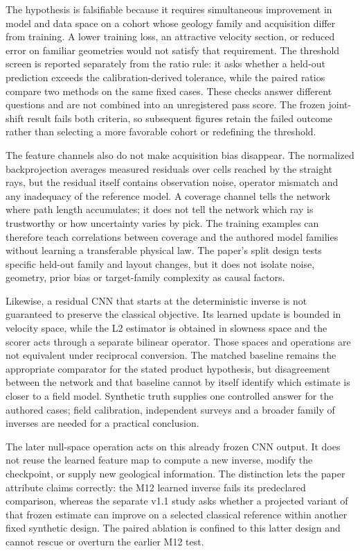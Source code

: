 \documentclass[11pt]{article}
\begin{document}
The hypothesis is falsifiable because it requires simultaneous improvement in model and data space on a cohort whose geology family and acquisition differ from training. A lower training loss, an attractive velocity section, or reduced error on familiar geometries would not satisfy that requirement. The threshold screen is reported separately from the ratio rule: it asks whether a held-out prediction exceeds the calibration-derived tolerance, while the paired ratios compare two methods on the same fixed cases. These checks answer different questions and are not combined into an unregistered pass score. The frozen joint-shift result fails both criteria, so subsequent figures retain the failed outcome rather than selecting a more favorable cohort or redefining the threshold.

The feature channels also do not make acquisition bias disappear. The normalized backprojection averages measured residuals over cells reached by the straight rays, but the residual itself contains observation noise, operator mismatch and any inadequacy of the reference model. A coverage channel tells the network where path length accumulates; it does not tell the network which ray is trustworthy or how uncertainty varies by pick. The training examples can therefore teach correlations between coverage and the authored model families without learning a transferable physical law. The paper's split design tests specific held-out family and layout changes, but it does not isolate noise, geometry, prior bias or target-family complexity as causal factors.

Likewise, a residual CNN that starts at the deterministic inverse is not guaranteed to preserve the classical objective. Its learned update is bounded in velocity space, while the L2 estimator is obtained in slowness space and the scorer acts through a separate bilinear operator. Those spaces and operations are not equivalent under reciprocal conversion. The matched baseline remains the appropriate comparator for the stated product hypothesis, but disagreement between the network and that baseline cannot by itself identify which estimate is closer to a field model. Synthetic truth supplies one controlled answer for the authored cases; field calibration, independent surveys and a broader family of inverses are needed for a practical conclusion.

The later null-space operation acts on this already frozen CNN output. It does not reuse the learned feature map to compute a new inverse, modify the checkpoint, or supply new geological information. The distinction lets the paper attribute claims correctly: the M12 learned inverse fails its predeclared comparison, whereas the separate v1.1 study asks whether a projected variant of that frozen estimate can improve on a selected classical reference within another fixed synthetic design. The paired ablation is confined to this latter design and cannot rescue or overturn the earlier M12 test.
\end{document}
